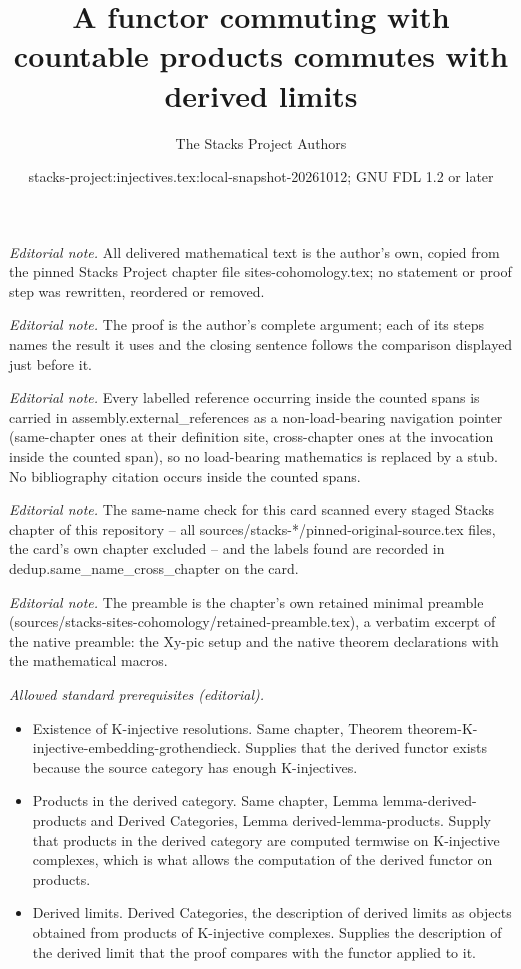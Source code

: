 \documentclass[10pt,a4paper]{amsart}
\title{A functor commuting with countable products commutes with derived limits}
\author{The Stacks Project Authors}
\date{stacks-project:injectives.tex:local-snapshot-20261012; GNU FDL 1.2 or later}
\theoremstyle{plain}
\theoremstyle{definition}
\theoremstyle{remark}
\numberwithin{equation}{subsection}
\begin{document}
\maketitle
\noindent\textit{Editorial note.} All delivered mathematical text is the author's own, copied from the pinned Stacks Project chapter file sites-cohomology.tex; no statement or proof step was rewritten, reordered or removed.\par\medskip
\noindent\textit{Editorial note.} The proof is the author's complete argument; each of its steps names the result it uses and the closing sentence follows the comparison displayed just before it.\par\medskip
\noindent\textit{Editorial note.} Every labelled reference occurring inside the counted spans is carried in assembly.external\_references as a non-load-bearing navigation pointer (same-chapter ones at their definition site, cross-chapter ones at the invocation inside the counted span), so no load-bearing mathematics is replaced by a stub. No bibliography citation occurs inside the counted spans.\par\medskip
\noindent\textit{Editorial note.} The same-name check for this card scanned every staged Stacks chapter of this repository -- all sources/stacks-*/pinned-original-source.tex files, the card's own chapter excluded -- and the labels found are recorded in dedup.same\_name\_cross\_chapter on the card.\par\medskip
\noindent\textit{Editorial note.} The preamble is the chapter's own retained minimal preamble (sources/stacks-sites-cohomology/retained-preamble.tex), a verbatim excerpt of the native preamble: the Xy-pic setup and the native theorem declarations with the mathematical macros.\par\medskip
\noindent\textit{Allowed standard prerequisites (editorial).}\begin{itemize}
\item Existence of K-injective resolutions. Same chapter, Theorem theorem-K-injective-embedding-grothendieck. Supplies that the derived functor exists because the source category has enough K-injectives.
\item Products in the derived category. Same chapter, Lemma lemma-derived-products and Derived Categories, Lemma derived-lemma-products. Supply that products in the derived category are computed termwise on K-injective complexes, which is what allows the computation of the derived functor on products.
\item Derived limits. Derived Categories, the description of derived limits as objects obtained from products of K-injective complexes. Supplies the description of the derived limit that the proof compares with the functor applied to it.
\end{itemize}\medskip
\end{document}
